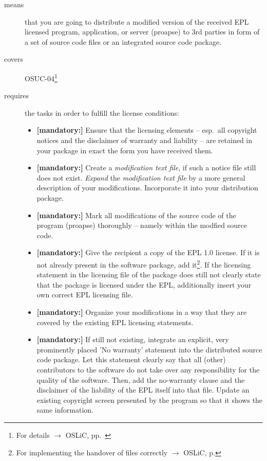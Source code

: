 \begin{description}
\item[means] that you are going to distribute a modified version of the received
EPL licensed program, application, or server (proapse) to 3rd parties in form
of a set of source code files or an integrated source code package.
\item[covers] OSUC-04\footnote{For details $\rightarrow$ OSLiC, pp.\ \pageref{OSUC-04-DEF}}
\item[requires] the tasks in order to fulfill the license conditions:
\begin{itemize}
  
  \item \textbf{[mandatory:]} Ensure that the licensing elements -- esp.\ all
  copyright notices and the disclaimer of warranty and liability -- are retained
  in your package in exact the form you have received them.
  
  \item \textbf{[mandatory:]} Create a \emph{modification text file}, if such a
  notice file still does not exist. \emph{Expand} the \emph{modification text
  file} by a more general description of your modifications. Incorporate it into
  your distribution package.
  
  \item \textbf{[mandatory:]} Mark all modifications of the source code of the
  program (proapse) thoroughly -- namely within the
  modfied source code.
  
  \item \textbf{[mandatory:]} Give the recipient a copy of the EPL 1.0 license.
  If it is not already present in the software package, add it\footnote{For
  implementing the handover of files correctly $\rightarrow$ OSLiC, p.
  \pageref{DistributingFilesHint}}. If the licensing statement in the licensing
  file of the package does still not clearly state that the package is licensed
  under the EPL, additionally insert your own correct EPL licensing file.

  \item \textbf{[mandatory:]} Organize your modifications in a way that they are
  covered by the existing EPL licensing statements.
  
  \item \textbf{[mandatory:]} If still not existing, integrate an explicit, very
  prominently placed 'No warranty' statement into the distributed source code
  package. Let this statement clearly say that all (other) contributors to the
  software do not take over any responsibility for the quality of the software.
  Then, add the no-warranty clause and the disclaimer of the liability of the
  EPL itself into that file. Update an existing copyright screen presented by
  the program so that it shows the same information.


\end{itemize}
\end{description}
